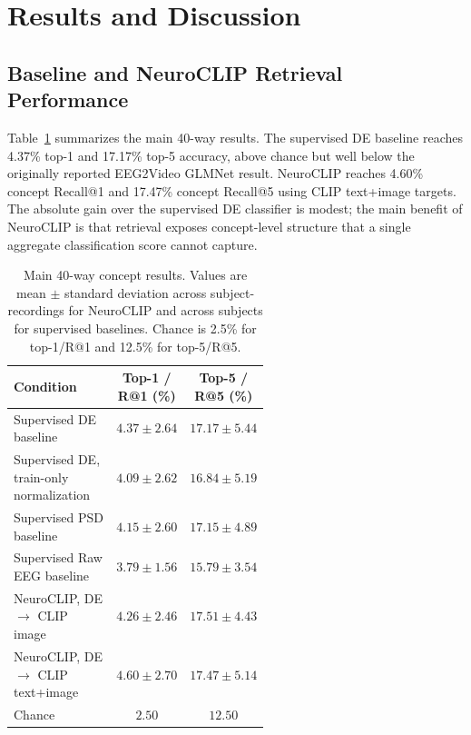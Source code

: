 \documentclass{article}
\begin{document}
\FloatBarrier

\section{Results and Discussion}

\subsection{Baseline and NeuroCLIP Retrieval Performance}

Table~\ref{tab:main_results} summarizes the main 40-way results. The supervised
DE baseline reaches 4.37\% top-1 and 17.17\% top-5 accuracy, above chance but
well below the originally reported EEG2Video GLMNet result. NeuroCLIP reaches
4.60\% concept Recall@1 and 17.47\% concept Recall@5 using CLIP text+image
targets. The absolute gain over the supervised DE classifier is modest; the main
benefit of NeuroCLIP is that retrieval exposes concept-level structure that a
single aggregate classification score cannot capture.

\begin{table}[!htbp]
\centering
\small
\setlength{\tabcolsep}{4pt}
\caption{Main 40-way concept results. Values are mean $\pm$ standard deviation
across subject-recordings for NeuroCLIP and across subjects for supervised
baselines. Chance is 2.5\% for top-1/R@1 and 12.5\% for top-5/R@5.}
\label{tab:main_results}
\begin{tabular}{>{\raggedright\arraybackslash}p{0.56\linewidth}cc}
\toprule
Condition & Top-1 / R@1 (\%) & Top-5 / R@5 (\%) \\
\midrule
Supervised DE baseline & $4.37 \pm 2.64$ & $17.17 \pm 5.44$ \\
Supervised DE, train-only normalization & $4.09 \pm 2.62$ & $16.84 \pm 5.19$ \\
Supervised PSD baseline & $4.15 \pm 2.60$ & $17.15 \pm 4.89$ \\
Supervised Raw EEG baseline & $3.79 \pm 1.56$ & $15.79 \pm 3.54$ \\
NeuroCLIP, DE $\rightarrow$ CLIP image & $4.26 \pm 2.46$ & $17.51 \pm 4.43$ \\
NeuroCLIP, DE $\rightarrow$ CLIP text+image & $\mathbf{4.60 \pm 2.70}$ & $\mathbf{17.47 \pm 5.14}$ \\
\midrule
Chance & $2.50$ & $12.50$ \\
\bottomrule
\end{tabular}
\end{table}
\end{document}
